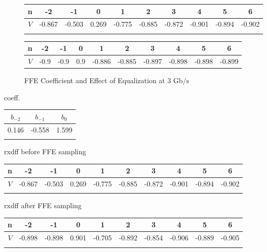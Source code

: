 \documentclass{book}  %
\begin{document}
\begin{paper}
\begin{figure}
	\begin{minipage}[tb]{\textwidth}
		\centering	
		\begin{tabular}{|c|c|c|c|c|c|c|c|c|c|}\hline
			n  &   -2   &   -1   &   0   &    1   &    2   &    3   &    4   &    5   &    6   \\ \hline 
			$V$ & -0.867 & -0.503 & 0.269 & -0.775 & -0.885 & -0.872 & -0.901 & -0.894 & -0.902 \\ \hline 
			\label{table:20G_rxdiff_sample_wo_FFE}
		\end{tabular}
		\label{table:20G_rxdiff_sample_wo_FFE}
	\end{minipage}	
	\begin{minipage}[tb]{\textwidth}
		\centering	
		\begin{tabular}{|c|c|c|c|c|c|c|c|c|c|}\hline
			n  &  -2  &  -1  &  0  &    1   &    2   &    3   &    4   &    5   &    6   \\ \hline 
			$V$ & -0.9 & -0.9 & 0.9 & -0.886 & -0.885 & -0.897 & -0.898 & -0.898 & -0.899 \\ \hline
		\end{tabular}
		\label{table:3G_rxdiff_sample_w__FFE} 
	\end{minipage}
	\caption{FFE Coefficient and Effect of Equalization at 3 Gb/s}
\end{figure}







coeff.
\begin{tabular}{|c|c|c|}\hline
	$b_{-2}$ & $b_{-1}$ &  $b_{0}$ \\ \hline 
	0.146 &   -0.558 &    1.599 \\ \hline
	\label{table:20G_FFE_coeff} 
\end{tabular}

rxdff before FFE sampling
\begin{tabular}{|c|c|c|c|c|c|c|c|c|c|}\hline
	n  &   -2   &   -1   &   0   &    1   &    2   &    3   &    4   &    5   &    6   \\ \hline 
	$V$ & -0.867 & -0.503 & 0.269 & -0.775 & -0.885 & -0.872 & -0.901 & -0.894 & -0.902 \\ \hline 
	\label{table:20G_rxdiff_sample_wo_FFE}
\end{tabular}

rxdff after FFE sampling
\begin{tabular}{|c|c|c|c|c|c|c|c|c|c|}\hline
	n  &   -2   &   -1   &   0   &    1   &    2   &    3   &    4   &    5   &    6   \\ \hline 
	$V$ & -0.898 & -0.898 & 0.901 & -0.705 & -0.892 & -0.854 & -0.906 & -0.889 & -0.905 \\ \hline 
	\label{table:20G_rxdiff_sample_w__FFE}
\end{tabular}


\end{paper}
\end{document}
